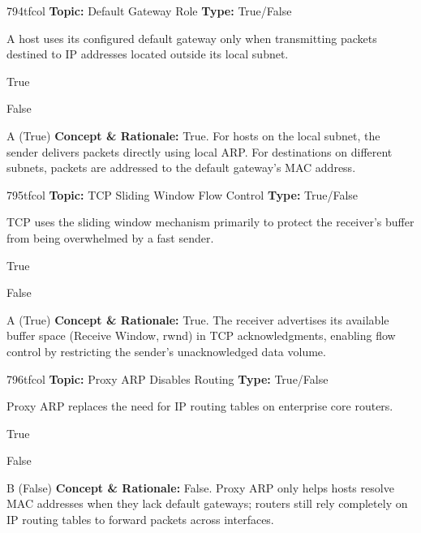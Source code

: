 \begin{qcard}{794}{tfcol}
\textcolor{darkslate!75}{\small\textbf{Topic:} Default Gateway Role \hfill \textbf{Type:} True/False}\vspace{0.4em}\par
A host uses its configured default gateway only when transmitting packets destined to IP addresses located outside its local subnet.
\begin{qoptions}
\item True
\item False
\end{qoptions}
\end{qcard}
\nopagebreak
\begin{explainbox}{A (True)}
\textbf{Concept \& Rationale:} True. For hosts on the local subnet, the sender delivers packets directly using local ARP. For destinations on different subnets, packets are addressed to the default gateway's MAC address.
\end{explainbox}

\begin{qcard}{795}{tfcol}
\textcolor{darkslate!75}{\small\textbf{Topic:} TCP Sliding Window Flow Control \hfill \textbf{Type:} True/False}\vspace{0.4em}\par
TCP uses the sliding window mechanism primarily to protect the receiver's buffer from being overwhelmed by a fast sender.
\begin{qoptions}
\item True
\item False
\end{qoptions}
\end{qcard}
\nopagebreak
\begin{explainbox}{A (True)}
\textbf{Concept \& Rationale:} True. The receiver advertises its available buffer space (Receive Window, rwnd) in TCP acknowledgments, enabling flow control by restricting the sender's unacknowledged data volume.
\end{explainbox}

\begin{qcard}{796}{tfcol}
\textcolor{darkslate!75}{\small\textbf{Topic:} Proxy ARP Disables Routing \hfill \textbf{Type:} True/False}\vspace{0.4em}\par
Proxy ARP replaces the need for IP routing tables on enterprise core routers.
\begin{qoptions}
\item True
\item False
\end{qoptions}
\end{qcard}
\nopagebreak
\begin{explainbox}{B (False)}
\textbf{Concept \& Rationale:} False. Proxy ARP only helps hosts resolve MAC addresses when they lack default gateways; routers still rely completely on IP routing tables to forward packets across interfaces.
\end{explainbox}

